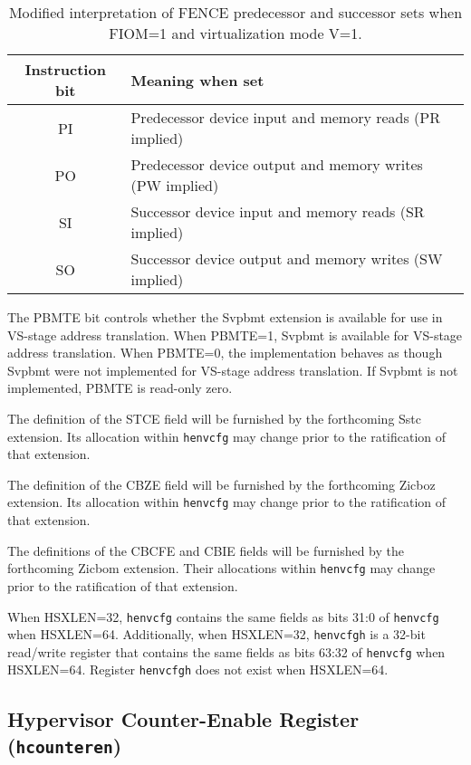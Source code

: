 \begin{table}[h!]
\begin{center}
\begin{tabular}{|c|l|}
\hline
Instruction bit & Meaning when set \\
\hline
PI & Predecessor device input and memory reads   (PR implied) \\
PO & Predecessor device output and memory writes (PW implied) \\
\hline
SI & Successor device input and memory reads     (SR implied) \\
SO & Successor device output and memory writes   (SW implied) \\
\hline
\end{tabular}
\end{center}
\vspace{-0.1in}
\caption{%
Modified interpretation of FENCE predecessor and successor sets when
FIOM=1 and virtualization mode V=1.%
}
\label{tab:henvcfg-FIOM}
\end{table}

The PBMTE bit controls whether the Svpbmt extension is available for use in
VS-stage address translation.
When PBMTE=1, Svpbmt is available for VS-stage address translation.
When PBMTE=0, the implementation behaves as though Svpbmt were not implemented
for VS-stage address translation.
If Svpbmt is not implemented, PBMTE is read-only zero.

The definition of the STCE field will be furnished by the
forthcoming Sstc extension.
Its allocation within {\tt henvcfg} may change prior to the ratification
of that extension.

The definition of the CBZE field will be furnished by the
forthcoming Zicboz extension.
Its allocation within {\tt henvcfg} may change prior to the ratification
of that extension.

The definitions of the CBCFE and CBIE fields will be furnished by the
forthcoming Zicbom extension.
Their allocations within {\tt henvcfg} may change prior to the ratification
of that extension.

When HSXLEN=32, {\tt henvcfg} contains the same fields as bits 31:0
of {\tt henvcfg} when HSXLEN=64.
Additionally, when HSXLEN=32, {\tt henvcfgh} is a 32-bit read/write register that
contains the same fields as bits 63:32 of {\tt henvcfg} when
HSXLEN=64.
Register {\tt henvcfgh} does not exist when HSXLEN=64.

\subsection{Hypervisor Counter-Enable Register ({\tt hcounteren})}

